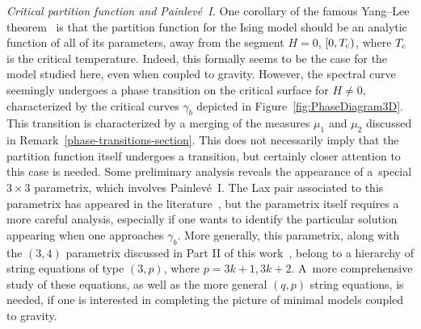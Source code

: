\documentclass[10pt,a4paper]{amsart}
\numberwithin{equation}{section}
\begin{document}
\textit{Critical partition function and Painlev\'{e}~I.} One corollary of the famous Yang--Lee theorem~\mbox{\cite{YangLee2, YangLee1}} is that
the partition function for the Ising model should be an analytic function of all of its parameters, away from the segment $H=0$, $[0,T_{\rm c})$,
where $T_{\rm c}$ is the critical temperature. Indeed, this formally seems to be the case for the model studied here, even when coupled
to gravity. However, the spectral curve seemingly undergoes a phase transition on the critical surface for $H\neq 0$, characterized by
the critical curves $\gamma_b$ depicted in Figure~\ref{fig:PhaseDiagram3D}. This transition is characterized by a merging of the
measures $\mu_1$ and $\mu_2$ discussed in Remark~\ref{phase-transitions-section}. This does not necessarily imply that the partition
function itself undergoes a transition, but certainly closer attention to this case is needed. Some preliminary analysis reveals the
appearance of a~special $3\times 3$ parametrix, which involves Painlev\'{e}~I. The Lax pair associated to this parametrix has
appeared in the literature~\cite{JKT}, but the parametrix itself requires a more careful analysis, especially if one wants to identify
the particular solution appearing when one approaches $\gamma_b$. More generally, this parametrix, along with the $(3,4)$ parametrix
discussed in Part II of this work~\cite{DHL2}, belong to a hierarchy of string equations of type $(3,p)$, where $p = 3k+1, 3k+2$. A~more comprehensive study of these equations, as well as the more general $(q,p)$ string equations, is needed, if one is interested in completing the picture of minimal models coupled to gravity.
\end{document}
